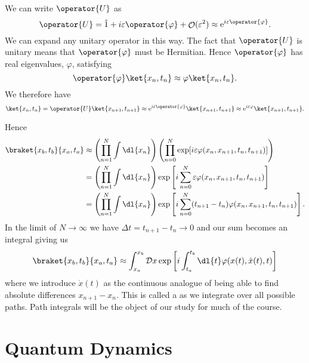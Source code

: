 \documentclass[fleqn]{NotesClass}
\newcommand*{\e}{\mathrm{e}}
\newcommand*{\idop}{\hat{1}}
\newcommand*{\order}{\mathop{\mathcal{O}}}
\begin{document}
    We can write \(\operator{U}\) as
    \begin{equation}
        \operator{U} = \idop + i\varepsilon\operator{\varphi} + \order(\varepsilon^2) \approx \e^{i\varepsilon\operator{\varphi}}.
    \end{equation}
    We can expand any unitary operator in this way.
    The fact that \(\operator{U}\) is unitary means that \(\operator{\varphi}\) must be Hermitian.
    Hence \(\operator{\varphi}\) has real eigenvalues, \(\varphi\), satisfying
    \begin{equation}
        \operator{\varphi} \ket{x_n, t_n} \approx \varphi \ket{x_n, t_n}.
    \end{equation}
    We therefore have
    \begin{equation}
        \ket{x_n, t_n} = \operator{U}\ket{x_{n+1}, t_{n+1}} \approx \e^{i\varepsilon\operator{\varphi}}\ket{x_{n+1}, t_{n+1}} \approx \e^{i\varepsilon\varphi}\ket{x_{n+1}, t_{n+1}}.
    \end{equation}
    
    Hence
    \begin{align}
        \braket{x_b, t_b}{x_a, t_a} &\approx \left( \prod_{n=1}^{N} \int \dl{x_n} \right) \left( \prod_{n=0}^{N} \exp[i\varepsilon\varphi(x_n, x_{n+1}, t_n, t_{n+1})] \right)\\
        &= \left( \prod_{n=1}^{N} \int\dl{x_n} \right)\exp\left[ i\sum_{n=0}^{N} \varepsilon\varphi(x_n, x_{n+1}, t_n, t_{n+1}) \right]\\
        &= \left( \prod_{n=1}^{N} \int\dl{x_n} \right)\exp\left[ i\sum_{n=0}^{N} (t_{n+1} - t_n) \varphi(x_n, x_{n+1}, t_n, t_{n+1}) \right].
    \end{align}
    In the limit of \(N \to \infty\) we have \(\Delta t = t_{n+1} - t_n \to 0\) and our sum becomes an integral giving us
    \begin{equation}\label{eqn:integral over paths}
        \braket{x_b, t_b}{x_a, t_a} \approx \int_{x_a}^{x_b} \DL{x} \exp\left[ i\int_{t_a}^{t_b} \dl{t} \varphi(x(t), \dot{x}(t), t) \right]
    \end{equation}
    where we introduce \(\dot{x}(t)\) as the continuous analogue of being able to find absolute differences \(x_{n+1} - x_n\).
    This is called a  as we integrate over all possible paths.
    Path integrals will be the object of our study for much of the course.
    
    \part{Quantum Dynamics}
\end{document}
